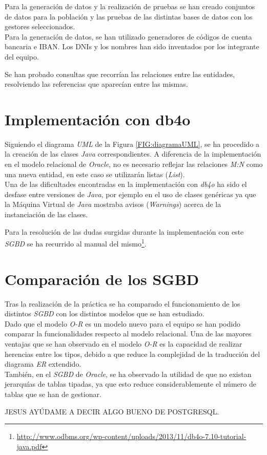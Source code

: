 \documentclass{article}
\begin{document}
Para la generación de datos y la realización de pruebas se han creado conjuntos de datos para la población y las pruebas de las distintas bases de datos con los gestores seleccionados.\\

Para la generación de datos, se han utilizado generadores de códigos de cuenta bancaria e IBAN. Los DNIs y los nombres han sido inventados por los integrante del equipo.

Se han probado consultas que recorrían las relaciones entre las entidades, resolviendo las referencias que aparecían entre las mismas.

\section{Implementación con db4o}

Siguiendo el diagrama \emph{UML} de la Figura \ref{FIG:diagramaUML}, se ha procedido a la creación de las clases \emph{Java} correspondientes. A diferencia de la implementación en el modelo relacional de \emph{Oracle}, no es necesario reflejar las relaciones \emph{M:N} como una nueva entidad, en este caso se utilizarán listas (\emph{List}).\\

Una de las dificultades encontradas en la implementación con \emph{db4o} ha sido el desfase entre versiones de \emph{Java}, por ejemplo en el uso de clases genéricas ya que la Máquina Virtual de \emph{Java} mostraba avisos (\emph{Warnings}) acerca de la instanciación de las clases.

Para la resolución de las dudas surgidas durante la implementación con este \emph{SGBD} se ha recurrido al manual del mismo\footnote{\url{http://www.odbms.org/wp-content/uploads/2013/11/db4o-7.10-tutorial-java.pdf}}.

\section{Comparación de los SGBD}

Tras la realización de la práctica se ha comparado el funcionamiento de los distintos \emph{SGBD} con los distintos modelos que se han estudiado.\\
Dado que el modelo \emph{O-R} es un modelo nuevo para el equipo se han podido comparar la funcionalidades respecto al modelo relacional. Una de las mayores ventajas que se han observado en el modelo \emph{O-R} es la capacidad de realizar herencias entre los tipos, debido a que reduce la complejidad de la traducción del diagrama \emph{ER} extendido.\\
También, en el \emph{SGBD} de \emph{Oracle}, se ha observado la utilidad de que no existan jerarquías de tablas tipadas, ya que esto reduce considerablemente el número de tablas que se han de gestionar.\\
\begin{Huge}
	JESUS AYÚDAME A DECIR ALGO BUENO DE POSTGRESQL.
\end{Huge}
\end{document}
